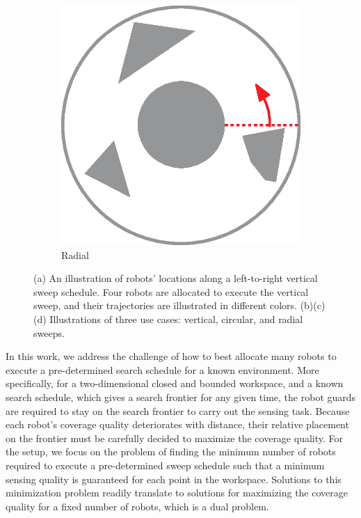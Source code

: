 \begin{figure}[t]
\begin{subfigure}[t]{0.115\textwidth}
         \centering
         \includegraphics[width=\textwidth]{chapters/sc/fig/rotational.eps}
         \caption{Radial}
         \label{fig:circular}
    \end{subfigure}
     
    \vspace{2mm}
    \caption{(a) An illustration of robots' locations along a left-to-right 
    vertical sweep schedule. Four robots are allocated to execute the vertical sweep, 
    and their trajectories are illustrated in different colors. 
    (b)(c)(d) Illustrations of three use cases: vertical, circular, 
    and radial sweeps.}
    \label{fig:sweep}
\end{figure}

In this work, we address the challenge of how to best allocate 
many robots to execute a pre-determined search schedule for a known environment. 
More specifically, for a two-dimensional closed and bounded workspace, and a known 
search schedule, which gives a search frontier for any given time, the robot guards 
are required to stay on the search frontier to carry out the sensing task. 
%
Because each robot's coverage quality deteriorates with distance, their relative 
placement on the frontier must be carefully decided to maximize the coverage quality. 
%
For the setup, we focus on the problem of finding the minimum number of robots required 
to execute a pre-determined sweep schedule such that a minimum sensing quality is 
guaranteed for each point in the workspace. Solutions to this minimization problem 
readily translate to solutions for maximizing the coverage quality for a fixed number 
of robots, which is a dual problem. 

